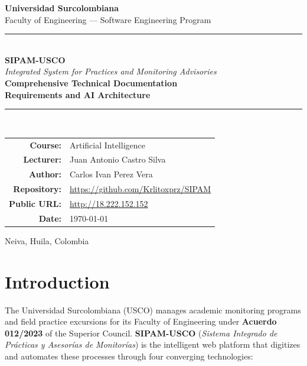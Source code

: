 \documentclass[12pt,a4paper,twoside]{report}
\begin{document}

\begin{titlepage}
\centering\vspace*{0.8cm}
{\LARGE\bfseries\textcolor{uscoRed}{Universidad Surcolombiana}}\\[0.2cm]
{\large Faculty of Engineering — Software Engineering Program}\\[1.4cm]
\textcolor{uscoRed}{\rule{\textwidth}{2.5pt}}\\[0.6cm]
{\fontsize{26}{30}\selectfont\bfseries\textcolor{uscoRed}{SIPAM-USCO}}\\[0.3cm]
{\large\itshape Integrated System for Practices and Monitoring Advisories}\\[0.4cm]
{\LARGE\bfseries Comprehensive Technical Documentation\\Requirements and AI Architecture}\\[0.6cm]
\textcolor{uscoRed}{\rule{\textwidth}{2.5pt}}\\[1.5cm]
\begin{tabular}{@{}rl@{}}
  \textbf{Course:}     & Artificial Intelligence \\[0.35cm]
  \textbf{Lecturer:}   & Juan Antonio Castro Silva \\[0.35cm]
  \textbf{Author:}     & Carlos Ivan Perez Vera \\[0.35cm]
  \textbf{Repository:} & \url{https://github.com/Krlitoxprz/SIPAM} \\[0.35cm]
  \textbf{Public URL:} & \url{http://18.222.152.152} \\[0.35cm]
  \textbf{Date:}       & \today \\
\end{tabular}
\vfill
{\large Neiva, Huila, Colombia}
\end{titlepage}

\tableofcontents\newpage
\listoffigures\newpage
\listoftables\newpage

\chapter{Introduction}

The Universidad Surcolombiana (USCO) manages academic monitoring programs and field practice
excursions for its Faculty of Engineering under \textbf{Acuerdo 012/2023} of the Superior Council.
\textbf{SIPAM-USCO} (\textit{Sistema Integrado de Prácticas y Asesorías de Monitorías}) is the
intelligent web platform that digitizes and automates these processes through four converging technologies:
\end{document}
